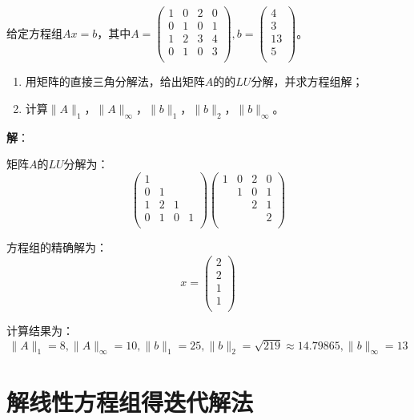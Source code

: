 \documentclass[UTF8,a4paper,11pt,oneside]{ctexbook}
\begin{document}
\vspace{4em}
给定方程组\(Ax=b\)，其中\(A=\begin{pmatrix}
    1 & 0 & 2 & 0 \\
    0 & 1 & 0 & 1 \\
    1 & 2 & 3 & 4 \\
    0 & 1 & 0 & 3 \\
\end{pmatrix},b=\begin{pmatrix}
    4 \\
    3 \\
    13 \\
    5 \\
\end{pmatrix}\)。
\begin{enumerate}
    \item 用矩阵的直接三角分解法，给出矩阵\(A\)的的\(LU\)分解，并求方程组解；
    \item 计算\(\|A\|_1\)，\(\|A\|_\infty\)，\(\|b\|_1\)，\(\|b\|_2\)，\(\|b\|_\infty\)。
\end{enumerate}
\textbf{解}：

矩阵\(A\)的\(LU\)分解为：
\[
\begin{pmatrix}
    1 & & & \\
    0 & 1 & & \\
    1 & 2 & 1 & \\
    0 & 1 & 0 & 1\\
\end{pmatrix}
\begin{pmatrix}
    1 & 0 & 2 & 0 \\
    & 1 & 0 & 1 \\
    & & 2 & 1 \\
    & & & 2 \\
\end{pmatrix}
\]

方程组的精确解为：
\[
x=\begin{pmatrix}
    2 \\
    2 \\
    1 \\
    1 \\
\end{pmatrix}
\]

计算结果为：
\[
\|A\|_1=8,\|A\|_\infty=10,\|b\|_1=25,\|b\|_2=\sqrt{219}\approx14.79865,\|b\|_\infty=13
\]

\chapter{解线性方程组得迭代解法}
\end{document}
